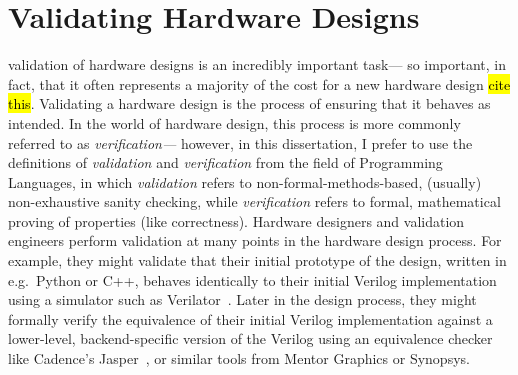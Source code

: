
\section{Validating Hardware Designs}

\Gls{validation} of hardware designs
  is an incredibly important task---%
  so important, in fact, that it often represents
  a majority of the cost
  for a new hardware design \hl{cite this}.
Validating a hardware design
  is the process of ensuring
  that it behaves as intended.
In the world of hardware design,
  this process is more commonly
  referred to as
  \textit{verification---}%
  however, in this dissertation,
  I prefer to use the definitions
  of \textit{validation} and \textit{verification}
  from the field of Programming Languages,
  in which \textit{validation}
  refers to non-formal-methods-based,
  (usually) non-exhaustive sanity checking,
  while \textit{verification}
  refers to formal, mathematical
  proving of properties (like correctness).
Hardware designers and validation engineers
  perform validation
  at many points in the hardware design process.
For example,
  they might validate that
  their initial prototype of the design,
  written in e.g.~Python or C++,
  behaves identically to their
  initial Verilog implementation
  using a simulator
  such as Verilator~\cite{verilator}.
Later in the design process,
  they might
  formally verify the equivalence
  of their initial Verilog implementation
  against a lower-level,
  backend-specific version of the Verilog
  using an equivalence checker
  like Cadence's Jasper~\cite{jasper},
  or similar tools from Mentor Graphics
  or Synopsys.


